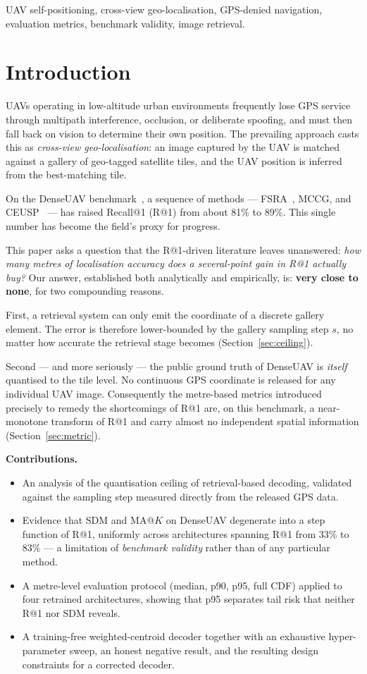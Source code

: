 \documentclass[journal]{IEEEtran}
\begin{document}
\begin{IEEEkeywords}
UAV self-positioning, cross-view geo-localisation, GPS-denied navigation, evaluation
metrics, benchmark validity, image retrieval.
\end{IEEEkeywords}

\section{Introduction}
UAVs operating in low-altitude urban environments frequently lose GPS
service through multipath interference, occlusion, or deliberate spoofing, and must then
fall back on vision to determine their own position. The prevailing approach casts this
as \emph{cross-view geo-localisation}: an image captured by the UAV is matched against a
gallery of geo-tagged satellite tiles, and the UAV position is inferred from the
best-matching tile.

On the DenseUAV benchmark~\cite{denseuav}, a sequence of methods --- FSRA~\cite{fsra},
MCCG, and CEUSP~\cite{ceusp} --- has raised Recall@1 (R@1) from about 81\% to 89\%.
This single number has become the field's proxy for progress.

This paper asks a question that the R@1-driven literature leaves unanswered:
\emph{how many metres of localisation accuracy does a several-point gain in R@1 actually
buy?} Our answer, established both analytically and empirically, is: \textbf{very close
to none}, for two compounding reasons.

First, a retrieval system can only emit the coordinate of a discrete gallery element.
The error is therefore lower-bounded by the gallery sampling step $s$, no matter how
accurate the retrieval stage becomes (Section~\ref{sec:ceiling}).

Second --- and more seriously --- the public ground truth of DenseUAV is \emph{itself}
quantised to the tile level. No continuous GPS coordinate is released for any individual
UAV image. Consequently the metre-based metrics introduced precisely to remedy the
shortcomings of R@1 are, on this benchmark, a near-monotone transform of R@1 and carry
almost no independent spatial information (Section~\ref{sec:metric}).

\textbf{Contributions.}
\begin{itemize}
\item An analysis of the quantisation ceiling of retrieval-based decoding, validated
against the sampling step measured directly from the released GPS data.
\item Evidence that SDM and MA@$K$ on DenseUAV degenerate into a step function of R@1,
uniformly across architectures spanning R@1 from 33\% to 83\% --- a limitation of
\emph{benchmark validity} rather than of any particular method.
\item A metre-level evaluation protocol (median, p90, p95, full CDF) applied to four
retrained architectures, showing that p95 separates tail risk that neither R@1 nor SDM
reveals.
\item A training-free weighted-centroid decoder together with an exhaustive
hyper-parameter sweep, an honest negative result, and the resulting design constraints
for a corrected decoder.
\end{itemize}
\end{document}
